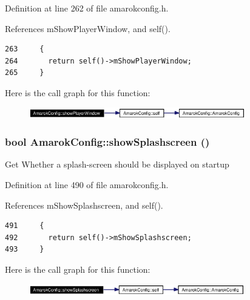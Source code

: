 Definition at line 262 of file amarokconfig.h.

References m\-Show\-Player\-Window, and self().



\footnotesize\begin{verbatim}263     {
264       return self()->mShowPlayerWindow;
265     }
\end{verbatim}\normalsize 


Here is the call graph for this function:\begin{figure}[H]
\begin{center}
\leavevmode
\includegraphics[width=267pt]{classAmarokConfig_AmarokConfige26_cgraph}
\end{center}
\end{figure}
\subsubsection{\setlength{\rightskip}{0pt plus 5cm}bool Amarok\-Config::show\-Splashscreen ()\hspace{0.3cm}{\tt  [inline, static]}}\label{classAmarokConfig_AmarokConfige50}


Get Whether a splash-screen should be displayed on startup 

Definition at line 490 of file amarokconfig.h.

References m\-Show\-Splashscreen, and self().



\footnotesize\begin{verbatim}491     {
492       return self()->mShowSplashscreen;
493     }
\end{verbatim}\normalsize 


Here is the call graph for this function:\begin{figure}[H]
\begin{center}
\leavevmode
\includegraphics[width=266pt]{classAmarokConfig_AmarokConfige50_cgraph}
\end{center}
\end{figure}
